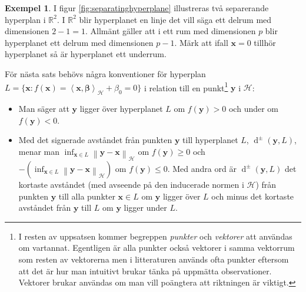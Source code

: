 \documentclass[a4paper, 12pt]{report}
\theoremstyle{definition}
\newtheorem{ex}{Exempel}[section]
\theoremstyle{remark}
\newcommand{\bfbeta}{{\boldsymbol{\beta}}}
\newcommand{\bfx}{\mathbf{x}}
\newcommand{\bfy}{\mathbf{y}}
\newcommand{\llangle}{\left\langle}
\newcommand{\rrangle}{\right\rangle}
\newcommand{\sephyp}{\{ \mathbf{x} : f\left(\mathbf{x}\right)=\inner{\bfx}{\bfbeta}_\mathcal{H} + \beta_0=0\}}
\newcommand{\inner}[2]{\llangle #1, #2 \rrangle}
\newcommand{\hil}{\mathcal{H}}
\begin{document}
\begin{ex}
	I figur \ref{fig:separatinghyperplane} illustreras två separerande hyperplan i $\mathbb{R}^2$. I $\mathbb{R}^2$ blir hyperplanet en linje det vill säga ett delrum med dimensionen $2-1=1$.
	Allmänt gäller att i ett rum med dimensionen $p$ blir hyperplanet ett delrum med dimensionen $p-1$.
	Märk att ifall $\bfx = 0$ tillhör hyperplanet så är hyperplanet ett underrum.
\end{ex}

För nästa sats behövs några konventioner för hyperplan $L=\sephyp$ i relation till en punkt\footnote{I resten av uppsatsen kommer begreppen \emph{punkter} och \emph{vektorer} att användas om vartannat. Egentligen är alla punkter också vektorer i samma vektorrum som resten av vektorerna men i litteraturen används ofta punkter eftersom att det är hur man intuitivt brukar tänka på uppmätta observationer. Vektorer brukar användas om man vill poängtera att riktningen är viktigt.}
$\bfy$ i $\hil$:
\begin{itemize}
	\item Man säger att $\bfy$ ligger över hyperplanet $L$ om $f\left(\bfy\right)>0$ och under om $f\left(\bfy\right)<0$.
	\item Med det signerade avståndet från punkten $\bfy$ till hyperplanet $L$, $\operatorname{d}^\pm\left(\bfy,L\right)$, menar man $\inf_{\bfx\in L} \left\|\bfy-\bfx\right\|_\hil$ om $f\left(\bfy\right)\geq0$ och $-\left(\inf_{\bfx\in L} \left\|\bfy-\bfx\right\|_\hil\right)$ om $f\left(\bfy\right)\leq0$.
	Med andra ord är $\operatorname{d}^\pm\left(\bfy,L\right)$ det kortaste avståndet (med avseende på den inducerade normen i $\hil$) från punkten $\bfy$ till alla punkter $\bfx\in L$ om $\bfy$ ligger över $L$ och minus det kortaste avståndet från $\bfy$ till $L$ om $\bfy$ ligger under $L$.
\end{itemize}
\end{document}
